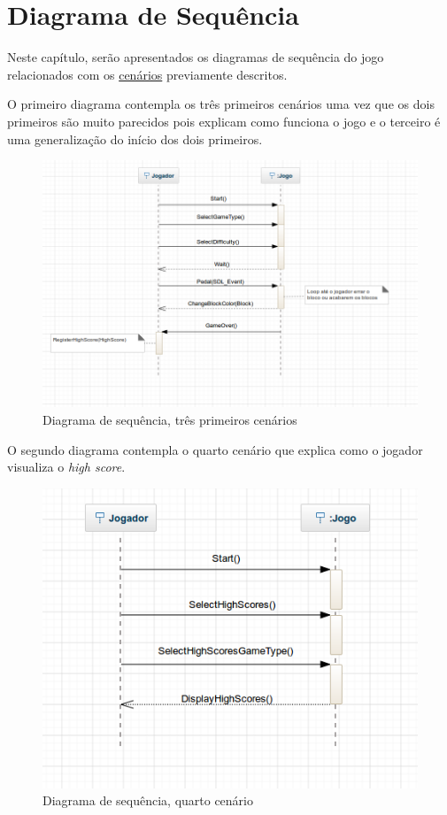 \chapter[Diagrama de Sequência]{Diagrama de Sequência}

Neste capítulo, serão apresentados os diagramas de sequência do jogo relacionados com os \hyperlink{cenarios}{cenários} previamente descritos.

O primeiro diagrama contempla os três primeiros cenários uma vez que os dois primeiros são muito parecidos pois explicam como funciona o jogo e o terceiro é uma generalização do início dos dois primeiros. 

\begin{figure}[H]
\centering\includegraphics[scale=0.5]{figuras/SequenceDiagram1.png}
\caption{Diagrama de sequência, três primeiros cenários}
\end{figure}

O segundo diagrama contempla o quarto cenário que explica como o jogador visualiza o \textit{high score}.

\begin{figure}[H]
\centering\includegraphics[scale=0.7]{figuras/SequenceDiagram2.png}
\caption{Diagrama de sequência, quarto cenário}
\end{figure}

